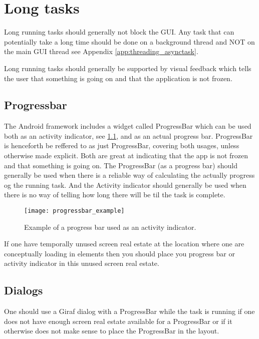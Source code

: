 
\chapter{Long tasks}
Long running tasks should generally not block the GUI. Any task that can potentially take a long time should be done on a background thread and NOT on the main GUI thread see Appendix \ref{app:threading_asynctask}. 

Long running tasks should generally be supported by visual feedback which tells the user that something is going on and that the application is not frozen. 

\section{Progressbar}
The Android framework includes a widget called ProgressBar which can be used both as an activity indicator, see \ref{fig:activity_indicator_in_dialog}, and as an actual progress bar. ProgressBar is henceforth be reffered to as just ProgressBar, covering both usages, unless otherwise made explicit. Both are great at indicating that the app is not frozen and that something is going on. The ProgressBar (as a progress bar) should generally be used when there is a reliable way of calculating the actually progress og the running task. And the Activity indicator should generally be used when there is no way of telling how long there will be til the task is complete. 

\begin{figure}[!htbp]
  \centering
    \texttt{[image: progressbar\_example]}
    \caption{Example of a progress bar used as an activity indicator.}
    \label{fig:activity_indicator_in_dialog}
\end{figure}

If one have temporally unused screen real estate at the location where one are conceptually loading in elements then you should place you progress bar or activity indicator in this unused screen real estate.

\section{Dialogs}
One should use a Giraf dialog with a ProgressBar while the task is running if one does not have enough screen real estate available for a ProgressBar or if it otherwise does not make sense to place the ProgressBar in the layout.  